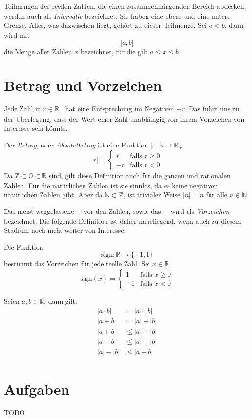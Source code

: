 \begin{definition}
Teilmengen der reellen Zahlen, die einen zusammenhängenden Bereich abdecken, werden auch als \textsl{Intervalle} bezeichnet. Sie haben eine obere und eine untere Grenze. Alles, was dazwischen liegt, gehört zu dieser Teilmenge. Sei $a<b$, dann wird mit
\[
\lbrack a,b \rbrack
\]
die Menge aller Zahlen $x$ bezeichnet, für die gilt $a\le x\le b$
\end{definition}

\section{Betrag und Vorzeichen}

Jede Zahl in $r\in \mathbb{R}_+$ hat eine Entsprechung im Negativen $-r$. Das führt uns zu der Überlegung, dass der Wert einer Zahl unabhängig von ihrem Vorzeichen von Interesse sein könnte.

\begin{definition}
Der \textsl{Betrag}, oder \textsl{Absolutbetrag} ist eine Funktion $\vert . \vert : \mathbb{R} \longrightarrow \mathbb{R}_+$
\begin{equation}
\vert r \vert = \begin{cases}
r & \text{falls } r\ge 0 \\
-r & \text{falls } r<0
\end{cases}
\end{equation}
Da $\mathbb{Z} \subset \mathbb{Q} \subset \mathbb{R}$ sind, gilt diese Definition auch für die ganzen und rationalen Zahlen. Für die natürlichen Zahlen ist sie sinnlos, da es keine negativen natürlichen Zahlen gibt. Aber da $\mathbb{N} \subset \mathbb{Z}$, ist trivialer Weise $\vert n \vert = n$ für alle $n\in \mathbb{N}$.
\end{definition}

Das meist weggelassene $+$ vor den Zahlen, sowie das $-$ wird als \textsl{Vorzeichen} bezeichnet. Die folgende Definition ist daher naheliegend, wenn auch zu diesem Stadium noch nicht weiter von Interesse:

\begin{definition}
Die Funktion 
\[
\text{sign} : \mathbb{R} \longrightarrow \lbrace -1,1\rbrace
\]
bestimmt das Vorzeichen für jede reelle Zahl. Sei $x \in \mathbb{R}$
\begin{equation}
\text{sign}(x) = \begin{cases}
1 & \text{falls } x\ge 0 \\
-1 & \text{falls } x < 0
\end{cases}
\end{equation}
\end{definition}
Seien $a,b\in \mathbb{R}$, dann gilt:
\begin{equation}
\begin{split}
|a\cdot b| &= |a|\cdot |b| \\
|a\div b| &= |a|\div |b| \\
|a+b| &\le |a|+|b| \\
|a-b| &\le |a|+|b| \\
|a|-|b| &\le |a-b| \\
\end{split}
\end{equation}


\section{Aufgaben}
TODO
